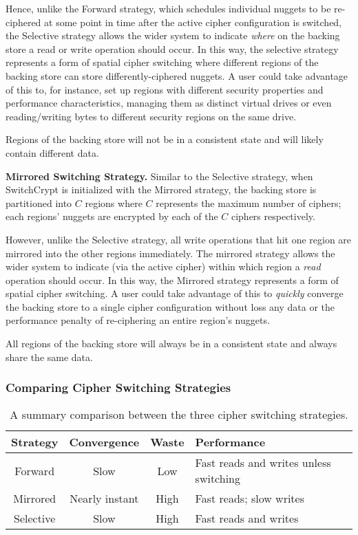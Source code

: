 Hence, unlike the Forward strategy, which schedules individual nuggets to be
re-ciphered at some point in time after the active cipher configuration is
switched, the Selective strategy allows the wider system to indicate
\emph{where} on the backing store a read or write operation should occur. In
this way, the selective strategy represents a form of spatial cipher switching
where different regions of the backing store can store differently-ciphered
nuggets. A user could take advantage of this to, for instance, set up regions
with different security properties and performance characteristics, managing
them as distinct virtual drives or even reading/writing bytes to different
security regions on the same drive.

Regions of the backing store will not be in a consistent state and will likely
contain different data.

\textbf{Mirrored Switching Strategy.} Similar to the Selective strategy, when
SwitchCrypt is initialized with the Mirrored strategy, the backing store is
partitioned into $C$ regions where $C$ represents the maximum number of ciphers;
each regions' nuggets are encrypted by each of the $C$ ciphers respectively.

However, unlike the Selective strategy, all write operations that hit one region
are mirrored into the other regions immediately. The mirrored strategy allows
the wider system to indicate (via the active cipher) within which region a
\emph{read} operation should occur. In this way, the Mirrored strategy
represents a form of spatial cipher switching. A user could take advantage of
this to \emph{quickly} converge the backing store to a single cipher
configuration without loss any data or the performance penalty of re-ciphering
an entire region's nuggets.

All regions of the backing store will always be in a consistent state and always
share the same data.

\subsubsection{Comparing Cipher Switching Strategies}

\begin{table}[]
   \begin{tabular}{@{}|c|c|c|C{25mm}|@{}}
      \toprule
      \textbf{Strategy} & \textbf{Convergence} & \textbf{Waste} & \textbf{Performance} \\ \midrule
      Forward   & Slow           & Low  & Fast reads and writes unless switching \\
      \hline
      Mirrored  & Nearly instant & High & Fast reads; slow writes \\
      \hline
      Selective & Slow           & High & Fast reads and writes  \\
      \hline
   \end{tabular}
   \caption{A summary comparison between the three cipher switching strategies.}
   \label{tbl:strategies-advantages}
\end{table}

